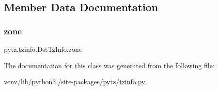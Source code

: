 \subsection{Member Data Documentation}
\mbox{\label{classpytz_1_1tzinfo_1_1DstTzInfo_a520c9787786c4b8df16a6978021e0188}} 
\subsubsection{\texorpdfstring{zone}{zone}}
{\footnotesize\ttfamily pytz.\+tzinfo.\+Dst\+Tz\+Info.\+zone\hspace{0.3cm}{\ttfamily [static]}}



The documentation for this class was generated from the following file\+:\begin{DoxyCompactItemize}
\item 
venv/lib/python3./site-\/packages/pytz/\hyperlink{tzinfo_8py}{tzinfo.\+py}\end{DoxyCompactItemize}
